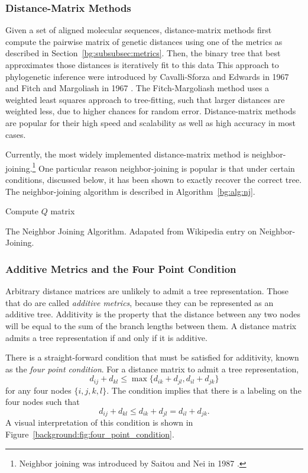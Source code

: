 \subsubsection{Distance-Matrix Methods}

Given a set of aligned molecular sequences, distance-matrix methods first compute the pairwise matrix of genetic distances using one of the metrics as described in Section~\ref{bg:subsubsec:metrics}.
Then, the binary tree that best approximates those distances is iteratively fit to this data
This approach to phylogenetic inference were introduced by Cavalli-Sforza and Edwards in 1967 \cite{CavalliSforza:1967th} and Fitch and Margoliash in 1967 \cite{Fitch:1967we}.
The Fitch-Margoliash method uses a weighted least squares approach to tree-fitting, such that larger distances are weighted less, due to higher chances for random error.
Distance-matrix methods are popular for their high speed and scalability as well as high accuracy in most cases.

Currently, the most widely implemented distance-matrix method is neighbor-joining.\footnote{Neighbor joining was introduced by Saitou and Nei in 1987 \cite{Saitou:1987wo}.}
One particular reason neighbor-joining is popular is that under certain conditions, discussed below, it has been shown to exactly recover the correct tree.
The neighbor-joining algorithm is described in Algorithm~\ref{bg:alg:nj}.

\begin{algorithm}
     {
        Compute $Q$ matrix\;
    }
    \label{bg:alg:nj}
    \caption{The Neighbor Joining Algorithm. Adapated from Wikipedia entry on Neighbor-Joining.}
\end{algorithm}

\subsubsection{Additive Metrics and the Four Point Condition}

Arbitrary distance matrices are unlikely to admit a tree representation.
Those that do are called \emph{additive metrics}, because they can be represented as an additive tree.
Additivity is the property that the distance between any two nodes will be equal to the sum of the branch lengths between them.
A distance matrix admits a tree representation if and only if it is additive.

There is a straight-forward condition that must be satisfied for additivity, known as the \emph{four point condition}.
For a distance matrix to admit a tree representation, 
\begin{equation}
d_{ij} + d_{kl} \leq \max\{d_{ik} + d_{jl} ,  d_{il} + d_{jk} \}
\end{equation}
for any four nodes $\{i,j,k,l\}$.
The condition implies that there is a labeling on the four nodes such that
\begin{equation}
d_{ij} + d_{kl} \leq d_{ik} + d_{jl} =  d_{il} + d_{jk}.
\end{equation}
A visual interpretation of this condition is shown in Figure~\ref{background:fig:four_point_condition}.

